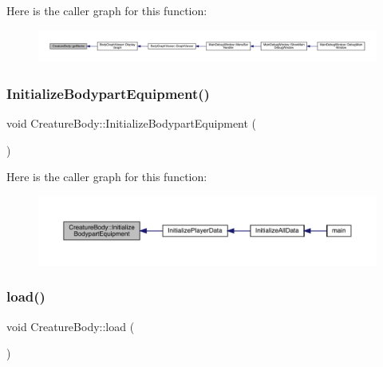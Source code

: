 Here is the caller graph for this function\+:
\nopagebreak
\begin{figure}[H]
\begin{center}
\leavevmode
\includegraphics[width=350pt]{da/d7d/class_creature_body_abfbe9ab6a145745934fc7fafefccdb67_icgraph}
\end{center}
\end{figure}
\mbox{\label{class_creature_body_af2b152c045862bb0fbc370b444bf98f0}} 
\subsubsection{\texorpdfstring{Initialize\+Bodypart\+Equipment()}{InitializeBodypartEquipment()}}
{\footnotesize\ttfamily void Creature\+Body\+::\+Initialize\+Bodypart\+Equipment (\begin{DoxyParamCaption}{ }\end{DoxyParamCaption})}

Here is the caller graph for this function\+:
\nopagebreak
\begin{figure}[H]
\begin{center}
\leavevmode
\includegraphics[width=350pt]{da/d7d/class_creature_body_af2b152c045862bb0fbc370b444bf98f0_icgraph}
\end{center}
\end{figure}
\mbox{\label{class_creature_body_a947efb646a893964de6244b886bab038}} 
\subsubsection{\texorpdfstring{load()}{load()}}
{\footnotesize\ttfamily void Creature\+Body\+::load (\begin{DoxyParamCaption}{ }\end{DoxyParamCaption})}

